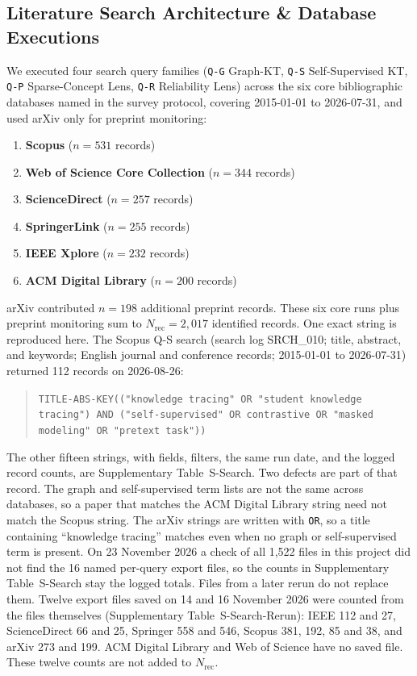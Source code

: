 \documentclass[lettersize,journal]{IEEEtran}
\begin{document}
\subsection{Literature Search Architecture \& Database Executions}
We executed four search query families (\texttt{Q-G} Graph-KT, \texttt{Q-S} Self-Supervised KT, \texttt{Q-P} Sparse-Concept Lens, \texttt{Q-R} Reliability Lens) across the six core bibliographic databases named in the survey protocol, covering 2015-01-01 to 2026-07-31, and used arXiv only for preprint monitoring:
\begin{enumerate}
    \item \textbf{Scopus} ($n = 531$ records)
    \item \textbf{Web of Science Core Collection} ($n = 344$ records)
    \item \textbf{ScienceDirect} ($n = 257$ records)
    \item \textbf{SpringerLink} ($n = 255$ records)
    \item \textbf{IEEE Xplore} ($n = 232$ records)
    \item \textbf{ACM Digital Library} ($n = 200$ records)
\end{enumerate}
arXiv contributed $n = 198$ additional preprint records. These six core runs plus preprint monitoring sum to $N_{\mathrm{rec}} = 2{,}017$ identified records. One exact string is reproduced here. The Scopus Q-S search (search log SRCH\_010; title, abstract, and keywords; English journal and conference records; 2015-01-01 to 2026-07-31) returned 112 records on 2026-08-26:
\begin{quote}
\texttt{TITLE-ABS-KEY(("knowledge tracing" OR "student knowledge tracing") AND ("self-supervised" OR contrastive OR "masked modeling" OR "pretext task"))}
\end{quote}
The other fifteen strings, with fields, filters, the same run date, and the logged record counts, are Supplementary Table~S-Search. Two defects are part of that record. The graph and self-supervised term lists are not the same across databases, so a paper that matches the ACM Digital Library string need not match the Scopus string. The arXiv strings are written with \texttt{OR}, so a title containing ``knowledge tracing'' matches even when no graph or self-supervised term is present. On 23 November 2026 a check of all 1,522 files in this project did not find the 16 named per-query export files, so the counts in Supplementary Table~S-Search stay the logged totals. Files from a later rerun do not replace them. Twelve export files saved on 14 and 16 November 2026 were counted from the files themselves (Supplementary Table~S-Search-Rerun): IEEE 112 and 27, ScienceDirect 66 and 25, Springer 558 and 546, Scopus 381, 192, 85 and 38, and arXiv 273 and 199. ACM Digital Library and Web of Science have no saved file. These twelve counts are not added to $N_{\mathrm{rec}}$.
\end{document}
